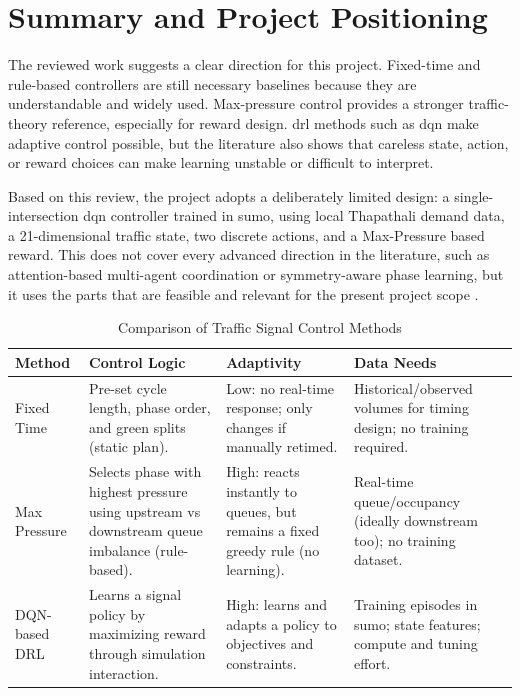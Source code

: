 \section{Summary and Project Positioning}
\label{sec:lit_review_summary}
\noindent The reviewed work suggests a clear direction for this project. Fixed-time and rule-based controllers are still necessary baselines because they are understandable and widely used. Max-pressure control provides a stronger traffic-theory reference, especially for reward design. \gls{drl} methods such as \gls{dqn} make adaptive control possible, but the literature also shows that careless state, action, or reward choices can make learning unstable or difficult to interpret.

Based on this review, the project adopts a deliberately limited design: a single-intersection \gls{dqn} controller trained in \gls{sumo}, using local Thapathali demand data, a 21-dimensional traffic state, two discrete actions, and a Max-Pressure based reward. This does not cover every advanced direction in the literature, such as attention-based multi-agent coordination or symmetry-aware phase learning, but it uses the parts that are feasible and relevant for the present project scope \cite{wei2020survey,wei2019presslight,wei2019colight,zheng2019learning,maharjan2023performance}.

\begin{table}[H]
    \centering
    \small
    \caption{Comparison of Traffic Signal Control Methods}
    \label{tab:traffic_control_methods}
    \begin{tabular}{p{2.5cm}p{4cm}p{4cm}p{4.5cm}}
        \toprule
        \textbf{Method} & \textbf{Control Logic} & \textbf{Adaptivity} & \textbf{Data Needs} \\
        \midrule
        Fixed Time & Pre-set cycle length, phase order, and green splits (static plan). & Low: no real-time response; only changes if manually retimed. & Historical/observed volumes for timing design; no training required. \\
        \addlinespace
        Max Pressure & Selects phase with highest pressure using upstream vs downstream queue imbalance (rule-based). & High: reacts instantly to queues, but remains a fixed greedy rule (no learning). & Real-time queue/occupancy (ideally downstream too); no training dataset. \\
        \addlinespace
        DQN-based DRL & Learns a signal policy by maximizing reward through simulation interaction. & High: learns and adapts a policy to objectives and constraints. & Training episodes in \gls{sumo}; state features; compute and tuning effort. \\
        \bottomrule
    \end{tabular}
\end{table}
